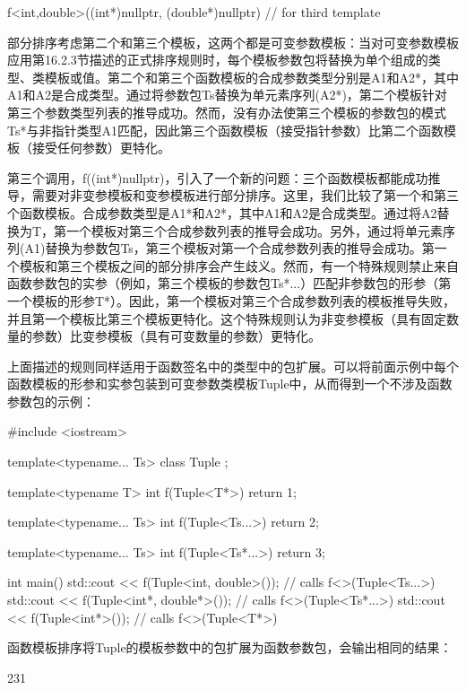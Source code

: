 \begin{cpp}
f<int,double>((int*)nullptr, (double*)nullptr) // for third template
\end{cpp}

部分排序考虑第二个和第三个模板，这两个都是可变参数模板：当对可变参数模板应用第16.2.3节描述的正式排序规则时，每个模板参数包将替换为单个组成的类型、类模板或值。第二个和第三个函数模板的合成参数类型分别是A1和A2*，其中A1和A2是合成类型。通过将参数包Ts替换为单元素序列(A2*)，第二个模板针对第三个参数类型列表的推导成功。然而，没有办法使第三个模板的参数包的模式Ts*与非指针类型A1匹配，因此第三个函数模板（接受指针参数）比第二个函数模板（接受任何参数）更特化。

第三个调用，f((int*)nullptr)，引入了一个新的问题：三个函数模板都能成功推导，需要对非变参模板和变参模板进行部分排序。这里，我们比较了第一个和第三个函数模板。合成参数类型是A1*和A2*，其中A1和A2是合成类型。通过将A2替换为T，第一个模板对第三个合成参数列表的推导会成功。另外，通过将单元素序列(A1)替换为参数包Ts，第三个模板对第一个合成参数列表的推导会成功。第一个模板和第三个模板之间的部分排序会产生歧义。然而，有一个特殊规则禁止来自函数参数包的实参（例如，第三个模板的参数包Ts*...）匹配非参数包的形参（第一个模板的形参T*）。因此，第一个模板对第三个合成参数列表的模板推导失败，并且第一个模板比第三个模板更特化。这个特殊规则认为非变参模板（具有固定数量的参数）比变参模板（具有可变数量的参数）更特化。

上面描述的规则同样适用于函数签名中的类型中的包扩展。可以将前面示例中每个函数模板的形参和实参包装到可变参数类模板Tuple中，从而得到一个不涉及函数参数包的示例：

\begin{cpp}
#include <iostream>

template<typename... Ts> class Tuple
{};

template<typename T>
int f(Tuple<T*>) {
	return 1;
}

template<typename... Ts>
int f(Tuple<Ts...>) {
	return 2;
}

template<typename... Ts>
int f(Tuple<Ts*...>) {
	return 3;
}

int main() {
	std::cout << f(Tuple<int, double>()); // calls f<>(Tuple<Ts...>)
	std::cout << f(Tuple<int*, double*>()); // calls f<>(Tuple<Ts*...>)
	std::cout << f(Tuple<int*>()); // calls f<>(Tuple<T*>)
}
\end{cpp}

函数模板排序将Tuple的模板参数中的包扩展为函数参数包，会输出相同的结果：

\begin{shell}
231
\end{shell}





















